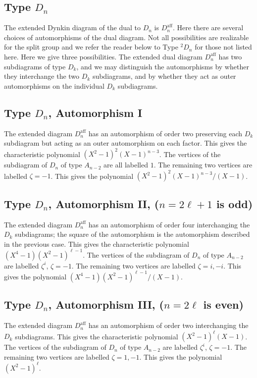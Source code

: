 \documentclass{amsart}
\def\aff{\operatorname{aff}}
\begin{document}
\subsection{Type $D_n$}
The extended Dynkin diagram of the dual to $D_n$ is $D_n^{\aff}$.  Here there
are several choices of automorphisms of the dual diagram.  Not all possibilities
are realizable for the split group and we refer the reader below to
Type ${}^2D_n$ for those not listed here.   Here we give three possibilities.
The extended dual diagram $D_n^{\aff}$ has two subdiagrams of type $D_k$, and
we may distinguish the automorphisms by whether they interchange the two
$D_k$ subdiagrams, and by whether they act as outer automorphisms on the
individual $D_k$ subdiagrams.

\subsection{Type $D_n$, Automorphism I}
The extended diagram $D_n^{\aff}$ has an automorphism of order two
preserving each $D_k$ subdiagram but acting as an outer automorphism on 
each factor.  This gives the characteristic polynomial $(X^2-1)^2(X-1)^{n-3}$.
The vertices of the subdiagram of $D_n$ of type $A_{n-2}$ are all labelled
$1$.  The remaining two vertices are labelled $\zeta=-1$.  This gives
the polynomial
$(X^2-1)^2(X-1)^{n-3}/(X-1)$.

\subsection{Type $D_n$, Automorphism II, ($n=2\ell+1$ is odd)}
The extended diagram $D_n^{\aff}$ has an automorphism of order four
interchanging the $D_k$ subdiagrams; the square of the automorphism is
the automorphism described in the previous case.  This gives the characteristic
polynomial  $(X^4-1)(X^2-1)^{\ell-1}$.  The vertices of the subdiagram
of $D_n$ of type $A_{n-2}$ are labelled $\zeta^i$, $\zeta=-1$.  The
remaining two vertices are labelled $\zeta=i,-i$.  This gives the polynomial
$(X^4-1)(X^2-1)^{\ell-1}/(X-1)$.

\subsection {Type $D_n$, Automorphism III, ($n=2\ell$ is even)}
The extended diagram $D_n^{\aff}$ has an automorphism of order two
interchanging the $D_k$ subdiagrams.  This gives the characteristic
polynomial $(X^2-1)^\ell(X-1)$.  The vertices of the subdiagram of $D_n$
of type $A_{n-2}$ are labelled $\zeta^i$, $\zeta=-1$.  The remaining
two vertices are labelled $\zeta=1,-1$.  This gives the polynomial
$(X^2-1)^\ell$.
\end{document}
